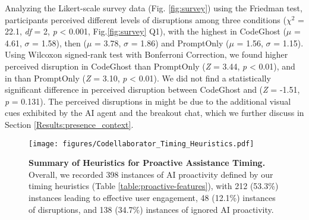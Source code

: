 Analyzing the Likert-scale survey data (Fig. \ref{fig:survey}) using the Friedman test, participants perceived different levels of disruptions among three conditions (\textit{$\chi^2$} = 22.1, \textit{df} = 2, \textit{p} < 0.001, Fig.\ref{fig:survey} Q1), with the highest in CodeGhost ($\mu$ = 4.61, $\sigma$ = 1.58), then \sys{} ($\mu$ = 3.78, $\sigma$ = 1.86) and PromptOnly ($\mu$ = 1.56, $\sigma$ = 1.15).
Using Wilcoxon signed-rank test with Bonferroni Correction, we found higher perceived disruption in CodeGhost than PromptOnly (\textit{Z} = 3.44, \textit{p} < 0.01), and in \sys{} than PromptOnly (\textit{Z} = 3.10, \textit{p} < 0.01).
We did not find a statistically significant difference in perceived disruption between CodeGhost and \sys{} (\textit{Z} = -1.51, \textit{p} = 0.131).
The perceived disruptions in \sys{} might be due to the additional visual cues exhibited by the AI agent and the breakout chat, which we further discuss in Section \ref{Results:presence_context}.




\begin{figure*}[h]

\centering
\texttt{[image: figures/Codellaborator\_Timing\_Heuristics.pdf]}
\caption{\textbf{Summary of Heuristics for Proactive Assistance Timing.} Overall, we recorded 398 instances of AI proactivity defined by our timing heuristics (Table \ref{table:proactive-features}), with 212 (53.3\%) instances leading to effective user engagement, 48 (12.1\%) instances of disruptions, and 138 (34.7\%) instances of ignored AI proactivity.}
\label{fig:timing_heuristics}
\end{figure*}


